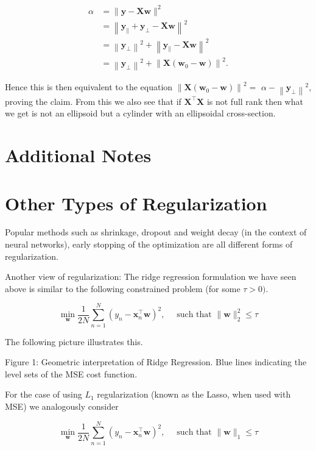 $$
\begin{aligned}
\alpha & =\|\mathbf{y}-\mathbf{X} \mathbf{w}\|^{2} \\
& =\left\|\mathbf{y}_{\|}+\mathbf{y}_{\perp}-\mathbf{X} \mathbf{w}\right\|^{2} \\
& =\left\|\mathbf{y}_{\perp}\right\|^{2}+\left\|\mathbf{y}_{\|}-\mathbf{X} \mathbf{w}\right\|^{2} \\
& =\left\|\mathbf{y}_{\perp}\right\|^{2}+\left\|\mathbf{X}\left(\mathbf{w}_{0}-\mathbf{w}\right)\right\|^{2} .
\end{aligned}
$$

Hence this is then equivalent to the equation $\left\|\mathbf{X}\left(\mathbf{w}_{0}-\mathbf{w}\right)\right\|^{2}=$ $\alpha-\left\|\mathbf{y}_{\perp}\right\|^{2}$, proving the claim. From this we also see that if $\mathbf{X}^{\top} \mathbf{X}$ is not full rank then what we get is not an ellipsoid but a cylinder with an ellipsoidal cross-section.

\section*{Additional Notes}
\section*{Other Types of Regularization}
Popular methods such as shrinkage, dropout and weight decay (in the context of neural networks), early stopping of the optimization are all different forms of regularization.

Another view of regularization: The ridge regression formulation we have seen above is similar to the following constrained problem (for some $\tau>0)$.

$$
\min _{\mathbf{w}} \frac{1}{2 N} \sum_{n=1}^{N}\left(y_{n}-\mathbf{x}_{n}^{\top} \mathbf{w}\right)^{2}, \quad \text { such that }\|\mathbf{w}\|_{2}^{2} \leq \tau
$$

The following picture illustrates this.


Figure 1: Geometric interpretation of Ridge Regression. Blue lines indicating the level sets of the MSE cost function.

For the case of using $L_{1}$ regularization (known as the Lasso, when used with MSE) we analogously consider

$$
\min _{\mathbf{w}} \frac{1}{2 N} \sum_{n=1}^{N}\left(y_{n}-\mathbf{x}_{n}^{\top} \mathbf{w}\right)^{2}, \quad \text { such that }\|\mathbf{w}\|_{1} \leq \tau
$$


